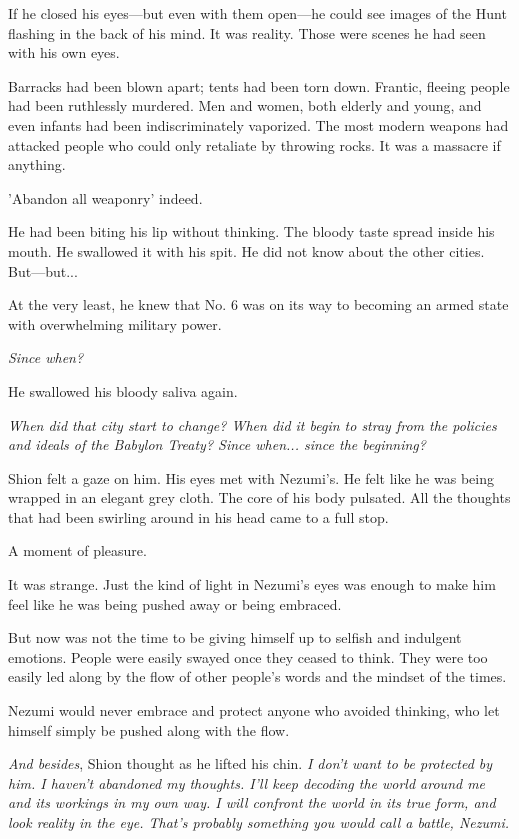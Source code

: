 If he closed his eyes---but even with them open---he could see images of the
Hunt flashing in the back of his mind. It was reality. Those were scenes
he had seen with his own eyes.

Barracks had been blown apart; tents had been torn down. Frantic,
fleeing people had been ruthlessly murdered. Men and women, both elderly
and young, and even infants had been indiscriminately vaporized. The
most modern weapons had attacked people who could only retaliate by
throwing rocks. It was a massacre if anything.

'Abandon all weaponry' indeed.

He had been biting his lip without thinking. The bloody taste spread
inside his mouth. He swallowed it with his spit. He did not know about
the other cities. But---but...

At the very least, he knew that No. 6 was on its way to becoming an
armed state with overwhelming military power.

\emph{Since when?}

He swallowed his bloody saliva again.

\emph{When did that city start to change? When did it begin to stray
from the policies and ideals of the Babylon Treaty? Since when... since
the beginning?}

\mybreak

Shion felt a gaze on him. His eyes met with Nezumi's. He felt like he
was being wrapped in an elegant grey cloth. The core of his body
pulsated. All the thoughts that had been swirling around in his head
came to a full stop.

A moment of pleasure.

It was strange. Just the kind of light in Nezumi's eyes was enough to
make him feel like he was being pushed away or being embraced.

But now was not the time to be giving himself up to selfish and
indulgent emotions. People were easily swayed once they ceased to think.
They were too easily led along by the flow of other people's words and
the mindset of the times.

Nezumi would never embrace and protect anyone who avoided thinking, who
let himself simply be pushed along with the flow.

\emph{And besides}, Shion thought as he lifted his chin. \emph{I don't want to be
protected by him. I haven't abandoned my thoughts. I'll keep decoding
the world around me and its workings in my own way. I will confront the
world in its true form, and look reality in the eye. That's probably
something you would call a battle, Nezumi.}

